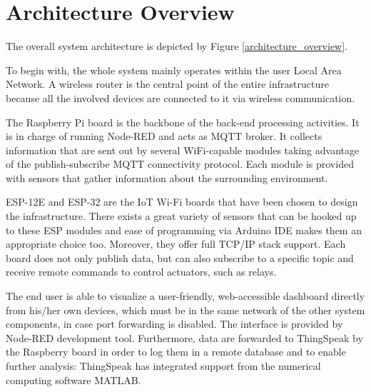 \section{Architecture Overview}
The overall system architecture is depicted by Figure \ref{architecture_overview}.

To begin with, the whole system mainly operates within the user Local Area Network. A wireless router is the central point of the entire infrastructure because all the involved devices are connected to it via wireless communication.

The Raspberry Pi board is the backbone of the back-end processing activities. It is in charge of running Node-RED and acts as MQTT broker. It collects information that are sent out by several WiFi-capable modules taking advantage of the publish-subscribe MQTT connectivity protocol. Each module is provided with sensors that gather information about the surrounding environment.

ESP-12E and ESP-32 are the IoT Wi-Fi boards that have been chosen to design the infrastructure. There exists a great variety of sensors that can be hooked up to these ESP modules and ease of programming via Arduino IDE makes them an appropriate choice too. Moreover, they offer full TCP/IP stack support.
Each board does not only publish data, but can also subscribe to a specific topic and receive remote commands to control actuators, such as relays.

The end user is able to visualize a user-friendly, web-accessible dashboard directly from his/her own devices, which must be in the same network of the other system components, in case port forwarding is disabled. The interface is provided by Node-RED development tool.
Furthermore, data are forwarded to ThingSpeak by the Raspberry board in order to log them in a remote database and to enable further analysis: ThingSpeak has integrated support from the numerical computing software MATLAB.

